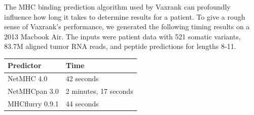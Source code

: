 \documentclass[10pt,letterpaper]{article}
\begin{document}
The MHC binding prediction algorithm used by Vaxrank can profoundly influence how long it takes to determine results for a patient. To give a rough sense of Vaxrank's performance, we generated the following timing results on a 2013 Macbook Air. The inputs were patient data with 521 somatic variants, 83.7M aligned tumor RNA reads, and peptide predictions for lengths 8-11.
\begin{center}
\begin{tabular}{ | l | l | }
    \hline
    Predictor & Time \\ \hline
    NetMHC 4.0 & 42 seconds\\
    NetMHCpan 3.0 & 2 minutes, 17 seconds \\
    MHCflurry 0.9.1 & 44 seconds \\ \hline
\end{tabular}

\end{center}
\end{document}
